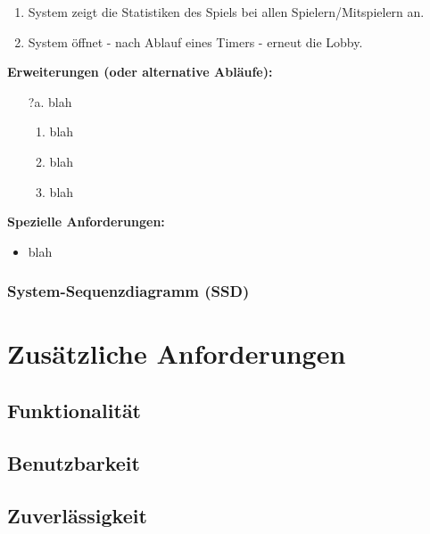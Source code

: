 \documentclass[11pt,ngerman]{article}
\begin{document}
\begin{tcolorbox}
\begin{enumerate}[resume]
                    \item System zeigt die Statistiken des Spiels bei allen Spielern/Mitspielern an.
                    \item System öffnet - nach Ablauf eines Timers  - erneut die Lobby.
                \end{enumerate}
                \textbf{Erweiterungen (oder alternative Abläufe):}
                \begin{itemize}
                    \item[?a.] blah
                        \begin{enumerate}
                            \item blah
                            \item blah
                            \item blah
                        \end{enumerate}
                \end{itemize}
                \textbf{Spezielle Anforderungen:}
                 \begin{itemize}
                    \item blah
                \end{itemize}

            \end{tcolorbox}

         \subsubsection{System-Sequenzdiagramm (SSD)}

    \section{Zusätzliche Anforderungen}

    \subsection{Funktionalität}

    \subsection{Benutzbarkeit}

    \subsection{Zuverlässigkeit}
\end{document}
